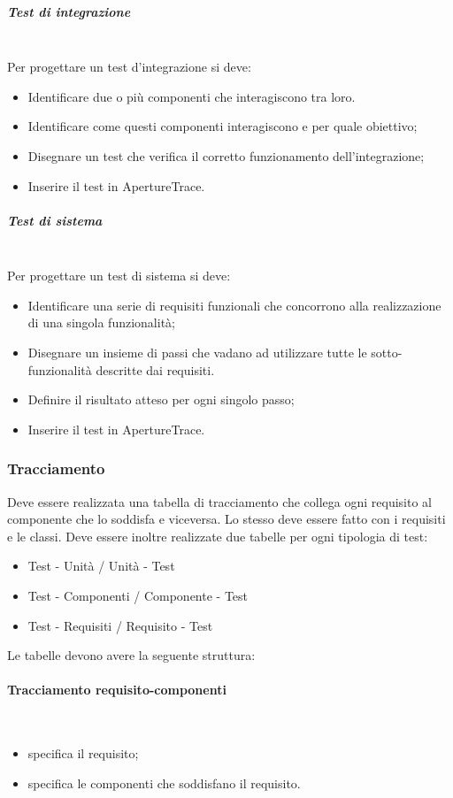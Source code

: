 \subparagraph{Test di integrazione} \hfill \\
Per progettare un test d'integrazione si deve:
\begin{itemize}
\item Identificare due o più componenti che interagiscono tra loro.
\item Identificare come questi componenti interagiscono e per quale obiettivo;
\item Disegnare un test che verifica il corretto funzionamento dell'integrazione;
\item Inserire il test in ApertureTrace.
\end{itemize}

\subparagraph{Test di sistema} \hfill \\
Per progettare un test di sistema si deve:
\begin{itemize}
\item Identificare una serie di requisiti funzionali che concorrono alla realizzazione di una singola funzionalità;
\item Disegnare un insieme di passi che vadano ad utilizzare tutte le sotto-funzionalità descritte dai requisiti.
\item Definire il risultato atteso per ogni singolo passo;
\item Inserire il test in ApertureTrace.
\end{itemize}

\subsubsection{Tracciamento}
Deve essere realizzata una tabella di tracciamento che collega ogni requisito al componente che lo soddisfa e viceversa. Lo stesso deve essere fatto con i requisiti e le classi.
Deve essere inoltre realizzate due tabelle per ogni tipologia di test:
\begin{itemize}
\item Test - Unità / Unità - Test
\item Test - Componenti / Componente - Test
\item Test - Requisiti / Requisito - Test
\end{itemize}

Le tabelle devono avere la seguente struttura:

\paragraph{Tracciamento requisito-componenti} \hfill \\
\begin{itemize}
\item {}specifica il requisito;
\item {}specifica le componenti che soddisfano il requisito.
\end{itemize}

